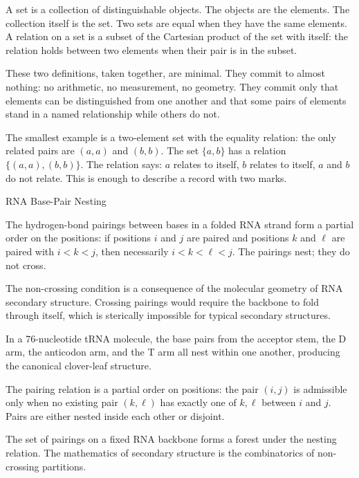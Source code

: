 A set is a collection of distinguishable objects. The objects are the elements.
The collection itself is the set. Two sets are equal when they have the same
elements. A relation on a set is a subset of the Cartesian product of the set
with itself: the relation holds between two elements when their pair is in the
subset.

These two definitions, taken together, are minimal. They commit to almost
nothing: no arithmetic, no measurement, no geometry. They commit only that
elements can be distinguished from one another and that some pairs of elements
stand in a named relationship while others do not.

The smallest example is a two-element set with the equality relation: the only
related pairs are $(a,a)$ and $(b,b)$. The set $\{a, b\}$ has a relation
$\{(a,a), (b,b)\}$. The relation says: $a$ relates to itself, $b$ relates to
itself, $a$ and $b$ do not relate. This is enough to describe a record with
two marks.

\begin{phenom}{RNA Base-Pair Nesting}
\label{ph:rna-base-pair-nesting}

\PhStatement The hydrogen-bond pairings between bases in a folded RNA strand
form a partial order on the positions: if positions $i$ and $j$ are paired
and positions $k$ and $\ell$ are paired with $i < k < j$, then necessarily
$i < k < \ell < j$. The pairings nest; they do not cross.

\PhOrigin The non-crossing condition is a consequence of the molecular
geometry of RNA secondary structure. Crossing pairings would require the
backbone to fold through itself, which is sterically impossible for
typical secondary structures.

\PhObservation In a 76-nucleotide tRNA molecule, the base pairs from the
acceptor stem, the D arm, the anticodon arm, and the T arm all nest within
one another, producing the canonical clover-leaf structure.

\PhConstraint The pairing relation is a partial order on positions: the
pair $(i, j)$ is admissible only when no existing pair $(k, \ell)$ has
exactly one of $k, \ell$ between $i$ and $j$. Pairs are either nested
inside each other or disjoint.

\PhConsequence The set of pairings on a fixed RNA backbone forms a forest
under the nesting relation. The mathematics of secondary structure is
the combinatorics of non-crossing partitions.

\end{phenom}

